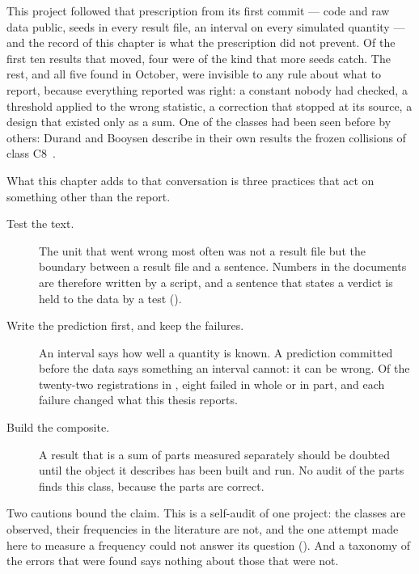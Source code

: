 This project followed that prescription from its first commit --- code and raw data public,
seeds in every result file, an interval on every simulated quantity --- and the record of this
chapter is what the prescription did not prevent. Of the first ten results that moved, four
were of the kind that more seeds catch. The rest, and all five found in October, were invisible
to any rule about what to report, because everything reported was right: a constant nobody had
checked, a threshold applied to the wrong statistic, a correction that stopped at its source,
a design that existed only as a sum. One of the classes had been seen before by others:
Durand and Booysen describe in their own results the frozen collisions of class
C8~\cite{durand2025loramesh}.

What this chapter adds to that conversation is three practices that act on something other than
the report.

\begin{description}
\item[Test the text.] The unit that went wrong most often was not a result file but the
boundary between a result file and a sentence. Numbers in the documents are therefore written
by a script, and a sentence that states a verdict is held to the data by a test
().
\item[Write the prediction first, and keep the failures.] An interval says how well a quantity
is known. A prediction committed before the data says something an interval cannot: it can be
wrong. Of the twenty-two registrations in , eight failed in whole or in part, and
each failure changed what this thesis reports.
\item[Build the composite.] A result that is a sum of parts measured separately should be
doubted until the object it describes has been built and run. No audit of the parts finds this
class, because the parts are correct.
\end{description}

\noindent Two cautions bound the claim. This is a self-audit of one project: the classes are
observed, their frequencies in the literature are not, and the one attempt made here to measure
a frequency could not answer its question (). And a taxonomy of the
errors that were found says nothing about those that were not.
